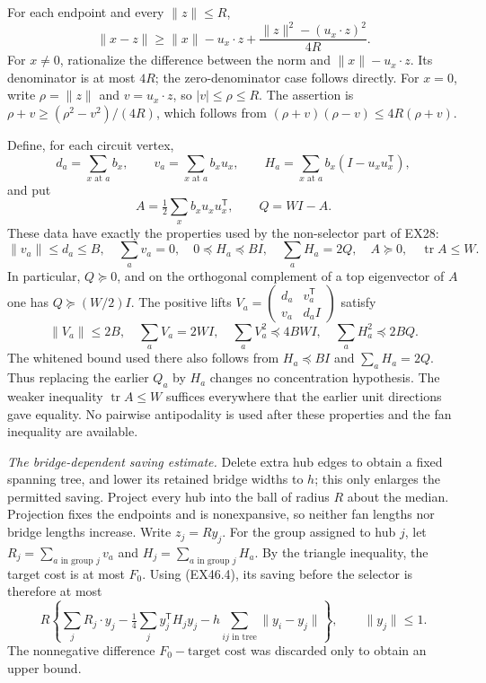 For each endpoint and every $\|z\|\le R$,
\[
 \|x-z\|\ge\|x\|-u_x\cdot z
       +\frac{\|z\|^2-(u_x\cdot z)^2}{4R}.
 \tag{EX46.4}
\]
For $x\ne0$, rationalize the difference between the norm and
$\|x\|-u_x\cdot z$. Its denominator is at most $4R$; the
zero-denominator case follows directly. For $x=0$, write
$\rho=\|z\|$ and $v=u_x\cdot z$, so $|v|\le\rho\le R$.
The assertion is
$\rho+v\ge(\rho^2-v^2)/(4R)$, which follows from
$(\rho+v)(\rho-v)\le4R(\rho+v)$.

Define, for each circuit vertex,
\[
 d_a=\sum_{x\text{ at }a}b_x,\qquad
 v_a=\sum_{x\text{ at }a}b_xu_x,\qquad
 H_a=\sum_{x\text{ at }a}b_x(I-u_xu_x^{\mathsf T}),
\]
and put
\[
 A=\tfrac12\sum_xb_xu_xu_x^{\mathsf T},\qquad Q=WI-A.
\]
These data have exactly the properties used by the non-selector
part of EX28:
\[
 \|v_a\|\le d_a\le B,\quad \sum_av_a=0,\quad
 0\preceq H_a\preceq BI,\quad \sum_aH_a=2Q,
 \quad A\succeq0,\quad\operatorname{tr}A\le W.
 \tag{EX46.5}
\]
In particular, $Q\succeq0$, and on the orthogonal complement of
a top eigenvector of $A$ one has $Q\succeq(W/2)I$.
The positive lifts
$V_a=\left(\begin{smallmatrix}d_a&v_a^{\mathsf T}\\v_a&d_aI\end{smallmatrix}\right)$
satisfy
\[
 \|V_a\|\le2B,\quad \sum_aV_a=2WI,
 \quad \sum_aV_a^2\preceq4BW I,
 \quad \sum_aH_a^2\preceq2BQ.
 \tag{EX46.6}
\]
The whitened bound used there also follows from
$H_a\preceq BI$ and $\sum_aH_a=2Q$. Thus replacing the earlier
$Q_a$ by $H_a$ changes no concentration hypothesis. The weaker
inequality $\operatorname{tr}A\le W$ suffices everywhere that the
earlier unit directions gave equality. No pairwise antipodality
is used after these properties and the fan inequality are available.

\emph{The bridge-dependent saving estimate.}
Delete extra hub edges to obtain a fixed spanning tree, and lower
its retained bridge widths to $h$; this only enlarges the permitted
saving. Project every hub into the ball of radius $R$ about the
median. Projection fixes the endpoints and is nonexpansive, so
neither fan lengths nor bridge lengths increase. Write $z_j=Ry_j$.
For the group assigned to hub $j$, let
$R_j=\sum_{a\text{ in group }j}v_a$ and
$H_j=\sum_{a\text{ in group }j}H_a$.
By the triangle inequality, the target cost is at most $F_0$.
Using (EX46.4), its saving before the selector is therefore at most
\[
 R\left\{\sum_jR_j\cdot y_j
       -\tfrac14\sum_jy_j^{\mathsf T}H_jy_j
       -h\sum_{ij\text{ in tree}}\|y_i-y_j\|\right\},
 \qquad\|y_j\|\le1.
 \tag{EX46.7}
\]
The nonnegative difference $F_0-\text{target cost}$ was discarded
only to obtain an upper bound.

